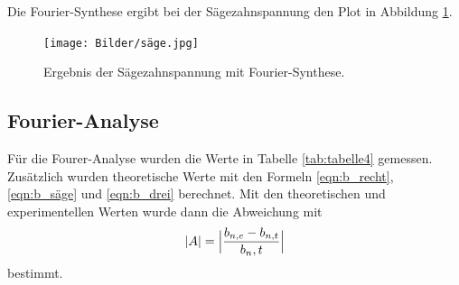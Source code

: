 Die Fourier-Synthese ergibt bei der Sägezahnspannung den Plot in Abbildung \ref{fig:säge}.
\begin{figure}[H]
  \centering
  \texttt{[image: Bilder/säge.jpg]}
  \caption{Ergebnis der Sägezahnspannung mit Fourier-Synthese.}
  \label{fig:säge}
\end{figure}

\subsection{Fourier-Analyse}
Für die Fourer-Analyse wurden die Werte in Tabelle \ref{tab:tabelle4} gemessen. 
Zusätzlich wurden theoretische Werte mit den Formeln \ref{eqn:b_recht}, \ref{eqn:b_säge} und \ref{eqn:b_drei} berechnet.
Mit den theoretischen und experimentellen Werten wurde dann die Abweichung mit 
\begin{equation}
  |A|=\Bigl|\frac{b_{n,e}-b_{n,t}}{b_n,t}\Bigr|
  \label{eqn:abweichung}
\end{equation}
bestimmt.

